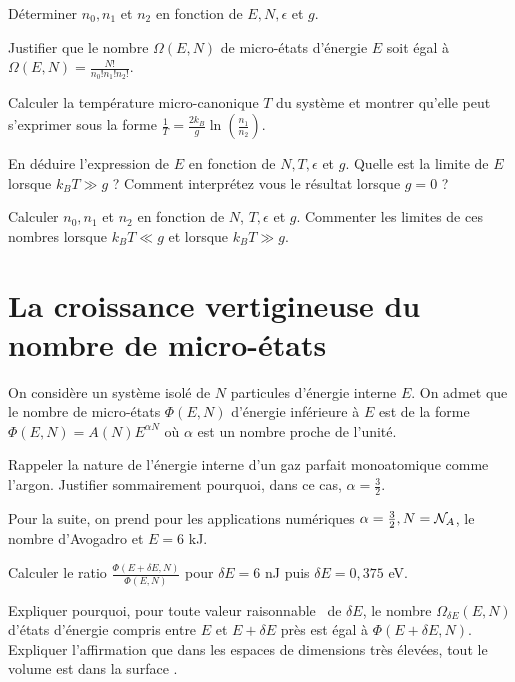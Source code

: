 \documentclass[utf8, 11pt]{feuille}
\begin{document}
\question
Déterminer $n_0, n_1$ et $n_2$ en fonction de $E, N, \epsilon$ et $g$.

\question
Justifier que le nombre $\Omega(E,N)$ de micro-états d'énergie $E$ soit égal à  $\Omega(E,N)=\frac{N!}{n_0!n_1!n_2!}$.


\question
Calculer la température micro-canonique $T$ du système et montrer qu'elle peut s'exprimer sous la forme $\frac{1}{T}=\frac{2k_B}{g}\ln(\frac{n_1}{n_2})$.

\question
En déduire l'expression de $E$ en fonction de $N, T, \epsilon$ et $g$. Quelle est la limite de $E$ lorsque $k_B T \gg g$ ? Comment interprétez vous le résultat lorsque $g=0$ ?

\question
Calculer $n_0, n_1$ et $n_2$ en fonction de $N$,  $T, \epsilon$ et $g$. Commenter les limites de ces nombres lorsque $k_B T \ll g$ et lorsque $k_B T \gg g$.



\section{La croissance vertigineuse du nombre de micro-états}

On considère un système isolé de $N$ particules d'énergie interne $E$. On admet que le nombre de micro-états $\Phi(E,N)$  d'énergie inférieure à $E$ est de la forme $\Phi(E,N)=A(N)E^{\alpha N}$ où $\alpha$ est un nombre proche de l'unité.

\question
Rappeler la nature de l'énergie interne d'un gaz parfait monoatomique comme l'argon. Justifier sommairement pourquoi, dans ce cas, $\alpha=\frac{3}{2}$.

Pour la suite, on prend pour les applications numériques $\alpha=\frac{3}{2}, N={\cal N}_A$, le nombre d'Avogadro et $E= 6$ kJ.

\question
Calculer le ratio $\frac{\Phi(E+\delta E,N)}{\Phi(E,N)}$ pour $\delta E= 6 $ nJ puis  $\delta E= 0,375 $ eV.

\question
Expliquer pourquoi, pour toute valeur \og raisonnable \fg \ de $\delta E$, le nombre $\Omega_{\delta E}(E,N)$ d'états d'énergie compris entre $E$ et $E+\delta E$ près est égal à $\Phi(E+\delta E,N)$. Expliquer l'affirmation que \og dans les espaces de dimensions très élevées, tout le volume est dans la surface \fg.
\end{document}
